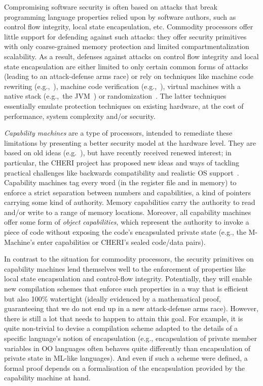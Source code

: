 \documentclass[compsoc,conference,letterpaper,fleqn]{IEEEtran}
\begin{document}
Compromising software security is often based on attacks that break programming
language properties relied upon by software authors, such as control flow
integrity, local state encapsulation, etc. Commodity processors offer little
support for defending against such attacks: they offer security primitives with
only coarse-grained memory protection and limited compartmentalization
scalability. As a result, defenses against attacks on control flow integrity and
local state encapsulation are either limited to only certain common forms of
attacks (leading to an attack-defense arms race) or rely on techniques like
machine code rewriting
(e.g.,~\cite{wahbe_efficient_1993,abadi_control-flow_2005}), machine code
verification (e.g.,~\cite{morrisett_system_1999}), virtual machines with a native
stack (e.g.,~the JVM~\cite{lindholm_java_2014}) or
randomization~\cite{forrest_building_1997}. The latter techniques essentially
emulate protection techniques on existing hardware, at the cost of performance,
system complexity and/or security.

\emph{Capability machines} are a type of processors, intended to
remediate these limitations by presenting a better security model at
the hardware level. They are based on old ideas
(e.g.~\cite{Carter:1994:HSF:195473.195579,Dennis:1966:PSM:365230.365252,shapiro_eros:_1999}),
but have recently received renewed interest; in particular, the CHERI
project has proposed new ideas and ways of tackling practical
challenges like backwards compatibility and realistic OS
support~\cite{Watson2015Cheri,Woodruff:2014:CCM:2665671.2665740}. Capability
machines tag every word (in the register file and in memory) to
enforce a strict separation between numbers and capabilities, a kind
of pointers carrying some kind of authority. Memory capabilities carry
the authority to read and/or write to a range of memory
locations. Moreover, all capability machines
offer some form of \emph{object capabilities}, which represent the
authority to invoke a piece of code without exposing the code's
encapsulated private state (e.g., the M-Machine's enter capabilities or
CHERI's sealed code/data pairs).

In contrast to the situation for commodity processors, the security
primitives on capability machines lend themselves well to the
enforcement of properties like local state encapsulation and
control-flow integrity. Potentially, they will enable new compilation
schemes that enforce such properties in a way that is efficient but
also 100\% watertight (ideally evidenced by a mathematical proof,
guaranteeing that we do not end up in a new attack-defense arms
race). However, there is still a lot that needs to happen to attain
this goal. For example, it is quite non-trivial to devise a
compilation scheme adapted to the details of a specific language's
notion of encapsulation (e.g., encapsulation of private member
variables in OO languages often behaves quite differently than
encapsulation of private state in ML-like languages). And even if such
a scheme were defined, a formal proof depends on a formalisation of
the encapsulation provided by the capability machine at hand.
\end{document}
